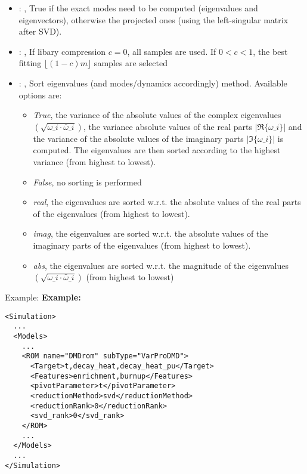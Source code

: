 \begin{itemize}
    \item {}: , 
      True if the exact modes need to be computed (eigenvalues and
      eigenvectors),   otherwise the projected ones (using the left-singular matrix after SVD).

    \item {}: , 
      If libary compression $c = 0$, all samples are used. If $0 < c < 1$, the best fitting
      $\lfloor \left(1 - c\right)m\rfloor$ samples are selected

    \item {}: , 
      Sort eigenvalues (and modes/dynamics accordingly) method. Available options are:
      \begin{itemize}                                                   \item \textit{True}, the
      variance of the absolute values of the complex eigenvalues
      $\left(\sqrt{\omega\_i \cdot \bar{\omega}\_i}\right)$, the variance absolute values
      of the real parts $\left|\Re\{{\omega\_i}\}\right|$ and the variance of the absolute
      values of the imaginary parts $\left|\Im\{{\omega\_i}\}\right|$ is computed. The
      eigenvalues are then sorted according to the highest variance (from highest to lowest).
      \item \textit{False}, no sorting is performed
      \item \textit{real}, the eigenvalues are sorted w.r.t. the absolute values of the real
      parts of the eigenvalues (from highest to lowest).
      \item \textit{imag}, the eigenvalues are sorted w.r.t. the absolute values of the imaginary
      parts of the eigenvalues (from highest to lowest).
      \item \textit{abs}, the eigenvalues are sorted w.r.t. the magnitude of the eigenvalues
      $\left(\sqrt{\omega\_i \cdot \bar{\omega}\_i}\right)$ (from highest to lowest)
      \end{itemize}
  \end{itemize}

\hspace{24pt}
Example:
\textbf{Example:}
\begin{lstlisting}[style=XML,morekeywords={name,subType}]
<Simulation>
  ...
  <Models>
    ...
    <ROM name="DMDrom" subType="VarProDMD">
      <Target>t,decay_heat,decay_heat_pu</Target>
      <Features>enrichment,burnup</Features>
      <pivotParameter>t</pivotParameter>
      <reductionMethod>svd</reductionMethod>
      <reductionRank>0</reductionRank>
      <svd_rank>0</svd_rank>
    </ROM>
    ...
  </Models>
  ...
</Simulation>
\end{lstlisting}

